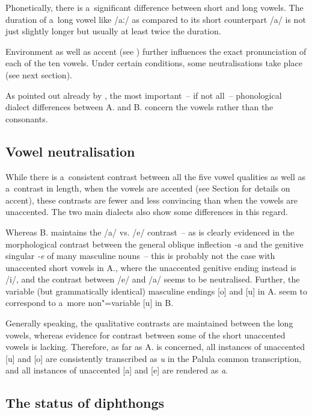 Phonetically, there is a~significant difference between short and long vowels. The duration of a~long vowel like /aː/ as compared to its short counterpart /a/ is not just slightly longer but usually at least twice the duration.


Environment as well as accent (see ) further influences the exact pronunciation of each of the ten vowels. Under certain conditions, some neutralisations take place (see next section). 


As pointed out already by \citet[58]{morgenstierne1932}, the most important~-- if not all~-- phonological dialect differences between A. and B. concern the vowels rather than the consonants. 

\subsection{Vowel neutralisation}
\label{subsec:3-2-2}

While there is a~consistent contrast between all the five vowel qualities as well as a~contrast in length, when the vowels are accented (see Section  for details on accent), these contrasts are fewer and less convincing than when the vowels are unaccented. The two main dialects also show some differences in this regard. 


Whereas B. maintains the /a/ vs. /e/ contrast~-- as is clearly evidenced in the morphological contrast between the general oblique inflection \textit{-a} and the genitive singular \textit{-e} of many masculine nouns~-- this is probably not the case with unaccented short vowels in A., where the unaccented genitive ending instead is /i/, and the contrast between /e/ and /a/ seems to be neutralised. Further, the variable (but grammatically identical) masculine endings [o] and [u] in A. seem to correspond to a~more non"=variable [u] in B. 


Generally speaking, the qualitative contrasts are maintained between the long vowels, whereas evidence for contrast between some of the short unaccented vowels is lacking. Therefore, as far as A. is concerned, all instances of unaccented [u] and [o] are consistently transcribed as \textit{u} in the Palula common transcription, and all instances of unaccented [a] and [e] are rendered as \textit{a}.


\subsection{The status of diphthongs}
\label{subsec:3-2-3}

